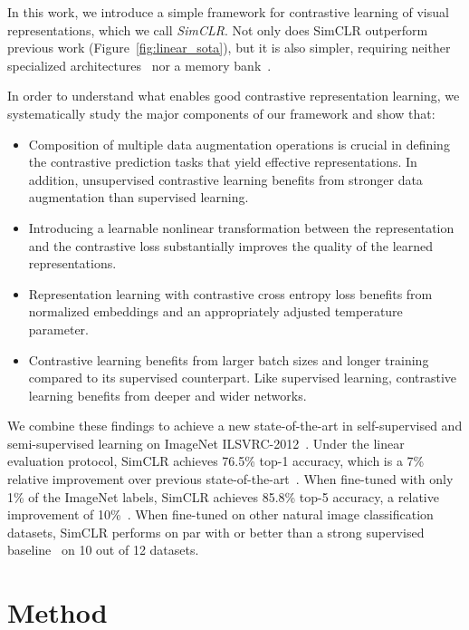 In this work, we introduce a simple framework for contrastive learning of visual representations, which we call \textit{SimCLR}.
Not only does SimCLR outperform previous work (Figure~\ref{fig:linear_sota}), but it is also simpler, requiring neither specialized architectures~\cite{bachman2019learning,henaff2019data} nor a memory bank~\cite{wu2018unsupervised,tian2019contrastive,he2019momentum,misra2019self}.

In order to understand what enables good contrastive representation learning, we systematically study the major components of our framework and show that:

\begin{itemize}[topsep=0pt, partopsep=0pt, leftmargin=13pt, parsep=0pt, itemsep=4pt]
    \item Composition of multiple data augmentation operations is crucial in defining the contrastive prediction tasks that yield effective representations. In addition, unsupervised contrastive learning benefits from stronger data augmentation than supervised learning.
    \item Introducing a learnable nonlinear transformation between the representation and the contrastive loss substantially improves the quality of the learned representations.
    \item Representation learning with contrastive cross entropy loss benefits from normalized embeddings and an appropriately adjusted temperature parameter.
    \item Contrastive learning benefits from larger batch sizes and longer training compared to its supervised counterpart. Like supervised learning, contrastive learning benefits from deeper and wider networks.
\end{itemize}

We combine these findings to achieve a new state-of-the-art in self-supervised and semi-supervised learning on ImageNet ILSVRC-2012~\cite{russakovsky2015imagenet}. Under the linear evaluation protocol, SimCLR achieves 76.5\% top-1 accuracy, which is a 7\% relative improvement over previous state-of-the-art~\cite{henaff2019data}. When fine-tuned with only 1\% of the ImageNet labels, SimCLR achieves 85.8\% top-5 accuracy, a relative improvement of 10\%~\cite{henaff2019data}.
When fine-tuned on other natural image classification datasets, SimCLR performs on par with or better than a strong supervised baseline~\cite{kornblith2019better} on 10 out of 12 datasets. \section{Method}
